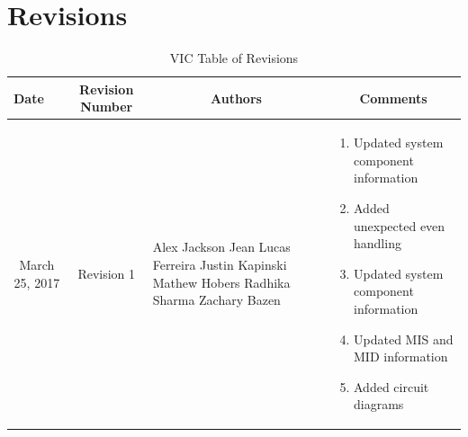 \documentclass [10pt]{article}
\begin{document}
\section{Revisions}
\begin{longtable}{| p{ } | p{ } | p{ } | p{ } |} \caption{VIC Table of Revisions}  \\

\hline 
\centering \textbf{Date} & 
\multicolumn{1}{c}{\textbf {Revision Number}} &
\multicolumn{1}{|c}{\textbf {Authors}} & 
\multicolumn{1}{|c|}{\textbf {Comments}} \\ \hline


\multicolumn{1}{|c|}{\multirow{1}{*}{\centering March 25, 2017}}  & 
\multicolumn{1}{c|}{\multirow{1}{*}{Revision 1}} &
\begin{minipage}{.21\columnwidth}
\vspace{1mm}
    Alex Jackson \newline
    Jean Lucas Ferreira \newline
    Justin Kapinski\newline
    Mathew Hobers\newline
    Radhika Sharma\newline
    Zachary Bazen     \vspace{1mm}
\end{minipage}&
\begin{minipage} {.27\columnwidth}
    \begin{enumerate}[label = - , leftmargin=0.11in]
        \itemsep -.5em
        \item Updated system component information
        \item Added unexpected even handling 
        \item Updated system component information
        \item Updated MIS and MID information
        \item Added circuit diagrams \vspace{1.5mm}
    \end{enumerate}
\end{minipage}\\ \hline 



\end{longtable}
\end{document}
